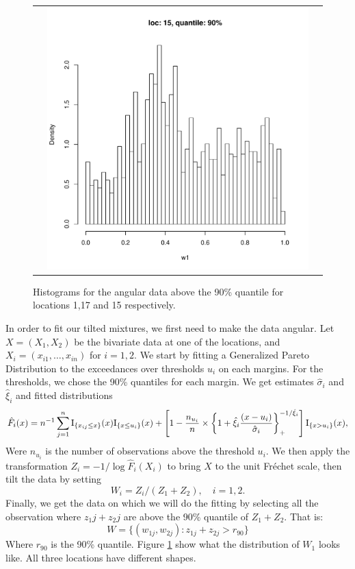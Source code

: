\begin{figure}[h]
\begin{tabular}{ccc}
&
\includegraphics[width=\textwidth/3]{../img/loc15/quantile90/histogram.pdf}\\
\end{tabular}
\caption{Histograms for the angular data above the 90\% quantile for locations 1,17 and 15 respectively.}
\label{fig:data_hist}
\end{figure}

In order to fit our tilted mixtures, we first need to make the data angular.
Let $X=(X_1,X_2)$ be the bivariate data at one of the locations, and $X_i = (x_{i1}, \ldots, x_{in})$ for $i=1,2$.
We start by fitting a Generalized Pareto Distribution to the exceedances over thresholds $u_i$ on each margins. For the thresholds, we chose the 90\% quantiles for each margin. We get estimates $\hat \sigma_i$ and $\hat \xi_i$  and fitted distributions
$$
\hat F_i(x) = n^{-1} \sum_{j=1}^n {\rm I}_{\{x_{ij}\leq x\}} (x)  {\rm I}_{\{x\leq u_i\}} (x) + \left[ 1 - \frac{n_{u_i}}{n} \times \left\{1 + \hat\xi_i\frac{(x-u_i)}{\hat \sigma_i} \right\}^{-1/\hat\xi_i}_+ \right] {\rm I}_{\{x>u_i\}} (x),
$$
Were $n_{u_i}$ is the number of observations above the threshold $u_i$. We then apply the transformation $ Z_i = -1/ \log \hat F_i(X_i)$ to bring $X$ to the unit Fréchet scale, then tilt the data by setting
$$
W_i = Z_i/(Z_1 + Z_2), \quad i=1,2.
$$
Finally, we get the data on which we will do the fitting by selecting all the observation where $z_1j + z_2j$ are above the 90\% quantile of $Z_1 + Z_2$. That is:
$$
W = \{ (w_{1j},w_{2j}) : z_{1j} + z_{2j} > r_{90} \}
$$
Where $r_{90}$ is the 90\% quantile. Figure \ref{fig:data_hist} show what the distribution of $W_1$ looks like. All three locations have different shapes.



